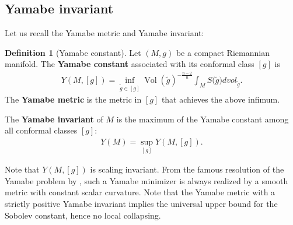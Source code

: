 \documentclass[12pt]{amsart}
\theoremstyle{definition}
\newtheorem{definition}[theorem]{Definition}
\begin{document}
\subsection{Yamabe invariant}
Let us recall the Yamabe metric and Yamabe invariant:
\begin{definition}[Yamabe constant]
    Let $(M,g)$ be a compact Riemannian manifold. The \textbf{Yamabe constant} associated with its conformal class $[g]$ is
    \begin{align*}
        Y(M,[g]) = \inf_{\tilde{g}\in[g]}\operatorname{Vol}(\tilde{g})^{-\frac{n-2}{n}}\int_M S({\tilde{g})} dvol_{\tilde{g}}.
    \end{align*}
    The \textbf{Yamabe metric} is the metric in $[g]$ that achieves the above infimum.

    The \textbf{Yamabe invariant} of $M$ is the maximum of the Yamabe constant among all conformal classes $[g]$:
    \begin{align*}
        Y(M) = \sup_{[g]} Y(M,[g]).
    \end{align*}
\end{definition}
Note that $Y(M,[g])$ is scaling invariant. From the famous resolution of the Yamabe problem by \cite{Ya60, Tr68, Au76, Sch84}, such a Yamabe minimizer is always realized by a smooth metric with constant scalar curvature. Note that the Yamabe metric with a strictly positive Yamabe invariant implies the universal upper bound for the Sobolev constant, hence no local collapsing.
\end{document}
